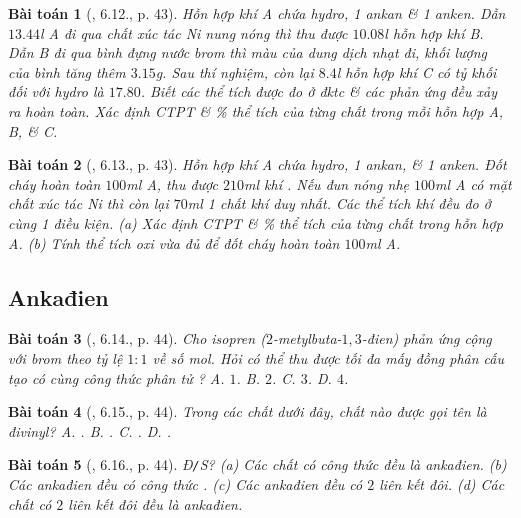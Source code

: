 \documentclass{article}
\newtheorem{baitoan}{Bài toán}
\begin{document}
\begin{baitoan}[\cite{SBT_Hoa_Hoc_11_co_ban}, 6.12., p. 43]
	Hỗn hợp khí A chứa hydro, 1 ankan \& 1 anken. Dẫn $13.44$\emph{l} A đi qua chất xúc tác \emph{Ni} nung nóng thì thu được $10.08$\emph{l} hỗn hợp khí B. Dẫn B đi qua bình đựng nước brom thì màu của dung dịch nhạt đi, khối lượng của bình tăng thêm $3.15$\emph{g}. Sau thí nghiệm, còn lại $8.4$\emph{l} hỗn hợp khí C có tỷ khối đối với hydro là $17.80$. Biết các thể tích được đo ở đktc \& các phản ứng đều xảy ra hoàn toàn. Xác định CTPT \& \% thể tích của từng chất trong mỗi hỗn hợp A, B, \& C.
\end{baitoan}

\begin{baitoan}[\cite{SBT_Hoa_Hoc_11_co_ban}, 6.13., p. 43]
	Hỗn hợp khí A chứa hydro, 1 ankan, \& 1 anken. Đốt cháy hoàn toàn $100$\emph{ml} A, thu được $210$\emph{ml} khí \emph{}. Nếu đun nóng nhẹ $100$\emph{ml} A có mặt chất xúc tác \emph{Ni} thì còn lại $70$\emph{ml} 1 chất khí duy nhất. Các thể  tích khí đều đo ở cùng 1 điều kiện. (a) Xác định CTPT \& \% thể tích của từng chất trong hỗn hợp A. (b) Tính thể tích oxi vừa đủ để đốt cháy hoàn toàn $100$\emph{ml} A.
\end{baitoan}


\subsection{Ankađien}

\begin{baitoan}[\cite{SBT_Hoa_Hoc_11_co_ban}, 6.14., p. 44]
	Cho isopren ($2$-metylbuta-$1,3$-đien) phản ứng cộng với brom theo tỷ lệ $1:1$ về số mol. Hỏi có thể thu được tối đa mấy đồng phân cấu tạo có cùng công thức phân tử \emph{}? {\sf A.} $1$. {\sf B.} $2$. {\sf C.} $3$. {\sf D.} $4$.
\end{baitoan}

\begin{baitoan}[\cite{SBT_Hoa_Hoc_11_co_ban}, 6.15., p. 44]
	Trong các chất dưới đây, chất nào được gọi tên là \emph{đivinyl}? {\sf A.} \emph{}. {\sf B.} \emph{}. {\sf C.} \emph{}. {\sf D.} \emph{}.
\end{baitoan}

\begin{baitoan}[\cite{SBT_Hoa_Hoc_11_co_ban}, 6.16., p. 44]
	\emph{Đ\texttt{/}S?} (a) Các chất có công thức \emph{} đều là ankađien. (b) Các ankađien đều có công thức \emph{}. (c) Các ankađien đều có $2$ liên kết đôi. (d) Các chất có $2$ liên kết đôi đều là ankađien.
\end{baitoan}
\end{document}
